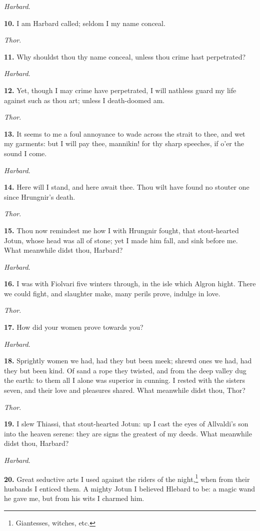 \emph{Harbard}.

\textbf{10.} I am Harbard called; seldom I my name conceal.

\emph{Thor}.

\textbf{11.} Why shouldst thou thy name conceal, unless thou crime hast
perpetrated?

\emph{Harbard}.

\textbf{12.} Yet, though I may crime have perpetrated, I will nathless guard
my life against such as thou art; unless I death-doomed am.

\emph{Thor}.

\textbf{13.} It seems to me a foul annoyance to wade across the strait to
thee, and wet my garments: but I will pay thee, mannikin! for thy
sharp speeches, if o'er the sound I come.

\emph{Harbard}.

\textbf{14.} Here will I stand, and here await thee. Thou wilt have found no
stouter one since Hrungnir's death.

\emph{Thor}.

\textbf{15.} Thou now remindest me how I with Hrungnir fought, that
stout-hearted Jotun, whose head was all of stone; yet I made him fall,
and sink before me. What meanwhile didst thou, Harbard?

\emph{Harbard}.

\textbf{16.} I was with Fiolvari five winters through, in the isle which
Algron hight. There we could fight, and slaughter make, many perils
prove, indulge in love.

\emph{Thor}.

\textbf{17.} How did your women prove towards you?

\emph{Harbard}.

\textbf{18.} Sprightly women we had, had they but been meek; shrewd ones we
had, had they but been kind. Of sand a rope they twisted, and from the
deep valley dug the earth: to them all I alone was superior in
cunning. I rested with the sisters seven, and their love and pleasures
shared. What meanwhile didst thou, Thor?

\emph{Thor}.

\textbf{19.} I slew Thiassi, that stout-hearted Jotun: up I cast the eyes of
Allvaldi's son into the heaven serene: they are signs the greatest of
my deeds. What meanwhile didst thou, Harbard?

\emph{Harbard}.

\textbf{20.} Great seductive arts I used against the riders of the night,\footnote{Giantesses, witches, etc.}
when from their husbands I enticed them. A mighty Jotun I believed
Hlebard to be: a magic wand he gave me, but from his wits I charmed
him.

